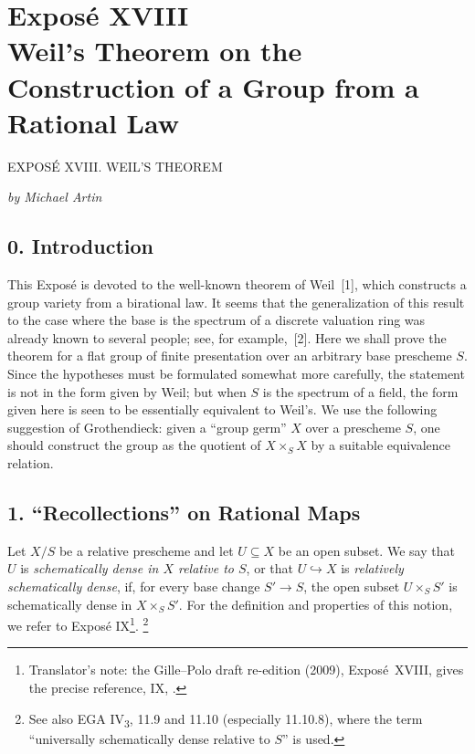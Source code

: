 
\chapter*{Exposé XVIII\\
Weil's Theorem on the Construction of a Group from a Rational Law}
  {EXPOSÉ XVIII. WEIL'S THEOREM}

\begin{center}
  \textit{by Michael Artin}
\end{center}
\begingroup
\renewcommand{\thefootnote}{0}
\endgroup

\section*{0. Introduction}

This Exposé is devoted to the well-known theorem of Weil~[1], which
constructs a group variety from a birational law. It seems that the
generalization of this result to the case where the base is the
spectrum of a discrete valuation ring was already known to several
people; see, for example,~[2]. Here we shall prove the theorem for a
flat group of finite presentation over an arbitrary base prescheme
\(S\). Since the hypotheses must be formulated somewhat more
carefully, the statement is not in the form given by Weil; but when
\(S\) is the spectrum of a field, the form given here is seen to be
essentially equivalent to Weil's. We use the following suggestion of
Grothendieck: given a ``group germ'' \(X\) over a prescheme \(S\), one
should construct the group as the quotient of \(X\times_S X\) by a
suitable equivalence relation.

\section*{1. ``Recollections'' on
Rational Maps}

Let \(X/S\) be a relative prescheme and let \(U\subseteq X\) be an
open subset. We say that \(U\) is \emph{schematically dense in \(X\)
relative to \(S\)}, or that \(U\hookrightarrow X\) is
\emph{relatively schematically dense}, if, for every base change
\(S'\to S\), the open subset \(U\times_S S'\) is schematically dense
in \(X\times_S S'\). For the definition and properties of this
notion, we refer to Exposé IX\footnote{Translator's note: the Gille--Polo draft re-edition (2009),
Exposé~XVIII, gives the precise reference, IX, .}.\begingroup
\renewcommand{\thefootnote}{*}\footnote{See also EGA
IV\textsubscript{3}, 11.9 and 11.10 (especially 11.10.8), where the
term ``universally schematically dense relative to \(S\)'' is used.}
\addtocounter{footnote}{-1}
\endgroup

